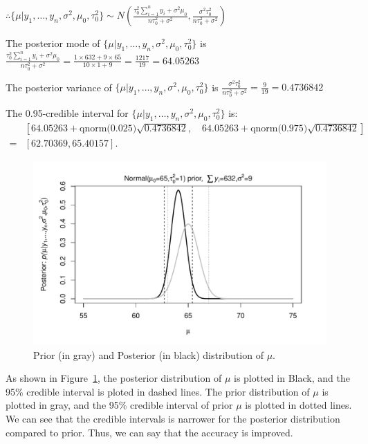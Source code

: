 \documentclass[11pt]{article}
\begin{document}
$\therefore \{\mu|y_1,\ldots,y_n, \sigma^2, \mu_0, \tau_0^2\} \sim N(\frac{ \tau_0^2 \sum_{i=1}^{n} y_i + \sigma^2\mu_0 }{n\tau_0^2+\sigma^2}, \frac{\sigma^2\tau_0^2}{n\tau_0^2+\sigma^2})$

The posterior mode of $\{\mu|y_1,\ldots,y_n, \sigma^2, \mu_0, \tau_0^2\}$ is $\frac{ \tau_0^2 \sum_{i=1}^{n} y_i + \sigma^2\mu_0 }{n\tau_0^2+\sigma^2} = \frac{1\times632+9\times 65}{10\times 1+9} = \frac{1217}{19} = 64.05263$

The posterior variance of $\{\mu|y_1,\ldots,y_n, \sigma^2, \mu_0, \tau_0^2\}$ is $\frac{\sigma^2\tau_0^2}{n\tau_0^2+\sigma^2} = \frac{9}{19} = 0.4736842$ 

The 0.95-credible interval for $\{\mu|y_1,\ldots,y_n, \sigma^2, \mu_0, \tau_0^2\}$ is:
\begin{align*}
&[64.05263+\text{qnorm(0.025)}\sqrt{0.4736842}, \quad 64.05263+\text{qnorm(0.975)}\sqrt{0.4736842} ] \\
=& [62.70369, 65.40157]
.\end{align*}

\begin{figure}[htpb]
	\centering
	\includegraphics[width=\textwidth]{Ast3-Q3.pdf}
	\caption{Prior (in gray) and Posterior (in black) distribution of $\mu$.}
	\label{fig:Ast3-Q3-pdf}
\end{figure}

As shown in Figure~\ref{fig:Ast3-Q3-pdf}, the posterior distribution of $\mu$ is plotted in Black, and the 95\% credible interval is ploted in dashed lines. The prior distribution of $\mu$ is plotted in gray, and the 95\% credible interval of prior $\mu$ is plotted in dotted lines. We can see that the credible intervals is narrower for the posterior distribution compared to prior. Thus, we can say that the accuracy is improved.
\end{document}
